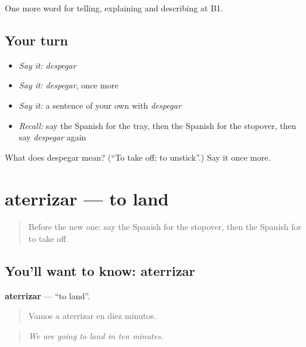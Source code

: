 \begin{grammarlens}[title={What you've built}]
One more word for telling, explaining and describing at B1.
\end{grammarlens}

\subsection*{Your turn}
\begin{itemize}
\raggedright
  \item \emph{Say it:} \emph{despegar}
  \item \emph{Say it:} \emph{despegar}, once more
  \item \emph{Say it:} a sentence of your own with \emph{despegar}
  \item \emph{Recall:} say the Spanish for the tray, then the Spanish for the stopover, then say \emph{despegar} again
\end{itemize}

\begin{tcolorbox}[breakable,colback=teal!4,colframe=teal!35!black,title={Before you move on}]
What does despegar mean? (\textquotedblleft{}To take off; to unstick\textquotedblright{}.) Say it once more.
\end{tcolorbox}
\section[aterrizar]{aterrizar — to land}

\label{lesson:ES-C654-aterrizar}



\begin{quote}
Before the new one: say the Spanish for the stopover, then the Spanish for to take off.
\end{quote}

\subsection*{You'll want to know: aterrizar}
\textbf{aterrizar} — \textquotedblleft{}to land\textquotedblright{}.

\begin{quote}
Vamos a aterrizar en diez minutos.
\end{quote}

\begin{quote}
\emph{We are going to land in ten minutes.}
\end{quote}

